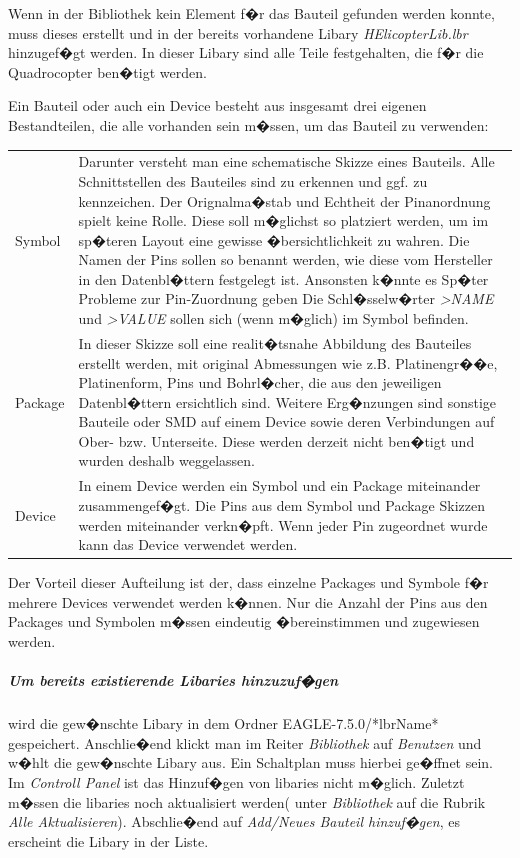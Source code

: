 Wenn in der Bibliothek kein Element f�r das Bauteil gefunden werden konnte, muss dieses erstellt und in der bereits vorhandene Libary \textit{HElicopterLib.lbr} hinzugef�gt werden. In dieser Libary sind alle Teile festgehalten, die f�r die Quadrocopter ben�tigt werden. 

Ein Bauteil oder auch ein Device besteht aus insgesamt drei eigenen Bestandteilen, die alle vorhanden sein m�ssen, um das Bauteil zu verwenden:
\begin{center}
	\begin{tabular}{l p{10 cm} }
	Symbol & Darunter versteht man eine schematische Skizze eines Bauteils. Alle Schnittstellen des Bauteiles sind zu erkennen und ggf. zu kennzeichen. \newline Der Orignalma�stab und Echtheit der Pinanordnung spielt keine Rolle. Diese soll m�glichst so platziert werden, um im sp�teren Layout eine gewisse �bersichtlichkeit zu wahren. Die Namen der Pins sollen so benannt werden, wie diese vom Hersteller in den Datenbl�ttern festgelegt ist. Ansonsten k�nnte es Sp�ter Probleme zur Pin-Zuordnung geben \newline Die Schl�sselw�rter \textit{>NAME} und \textit{>VALUE} sollen sich (wenn m�glich) im Symbol befinden. \\
	Package & In dieser Skizze soll eine realit�tsnahe Abbildung des Bauteiles erstellt werden, mit original Abmessungen wie z.B. Platinengr��e, Platinenform, Pins und Bohrl�cher, die aus den jeweiligen Datenbl�ttern ersichtlich sind. 
	Weitere Erg�nzungen sind sonstige Bauteile oder SMD auf einem Device sowie deren Verbindungen auf Ober- bzw. Unterseite. Diese werden derzeit nicht ben�tigt und wurden deshalb weggelassen. \\
	Device & In einem Device werden ein Symbol und ein Package miteinander zusammengef�gt. Die Pins aus dem Symbol und Package Skizzen werden  miteinander verkn�pft. Wenn jeder Pin zugeordnet wurde kann das Device verwendet werden.\\
	\end{tabular}
\end{center}

Der Vorteil dieser Aufteilung ist der, dass einzelne Packages und Symbole f�r mehrere Devices verwendet werden k�nnen. Nur die Anzahl der Pins aus den Packages und Symbolen m�ssen eindeutig �bereinstimmen und zugewiesen werden.

\subparagraph{Um bereits existierende Libaries hinzuzuf�gen} wird die gew�nschte Libary in dem Ordner EAGLE-7.5.0/*lbrName* gespeichert. Anschlie�end klickt man im Reiter \emph{Bibliothek} auf \emph{Benutzen} und w�hlt die gew�nschte Libary aus. Ein Schaltplan muss hierbei ge�ffnet sein. Im \textit{Controll Panel} ist das Hinzuf�gen von libaries nicht m�glich. Zuletzt m�ssen die libaries noch aktualisiert werden( unter \emph{Bibliothek} auf die Rubrik \emph{Alle Aktualisieren}). Abschlie�end auf  \textit{ Add/Neues Bauteil hinzuf�gen}, es erscheint die Libary in der Liste. 

